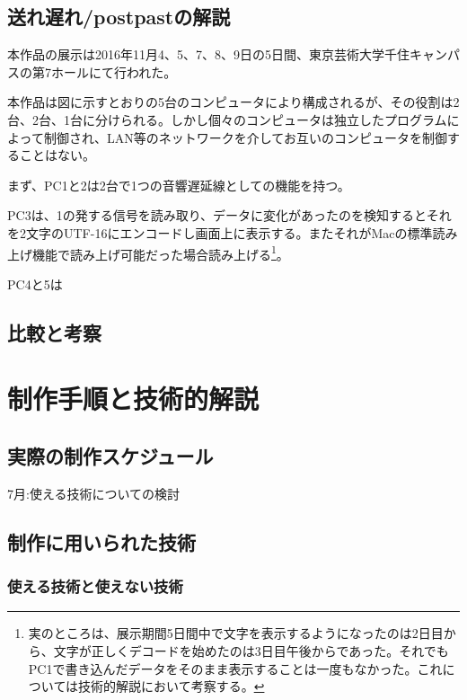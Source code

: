 \section{送れ\textbar{}遅れ/post\textbar{}pastの解説}\label{ux9001ux308cux9045ux308cpostpastux306eux89e3ux8aac}

本作品の展示は2016年11月4、5、7、8、9日の5日間、東京芸術大学千住キャンパスの第7ホールにて行われた。

本作品は図に示すとおりの5台のコンピュータにより構成されるが、その役割は2台、2台、1台に分けられる。しかし個々のコンピュータは独立したプログラムによって制御され、LAN等のネットワークを介してお互いのコンピュータを制御することはない。

まず、PC1と2は2台で1つの音響遅延線としての機能を持つ。

PC3は、1の発する信号を読み取り、データに変化があったのを検知するとそれを2文字のUTF-16にエンコードし画面上に表示する。またそれがMacの標準読み上げ機能で読み上げ可能だった場合読み上げる\footnote{実のところは、展示期間5日間中で文字を表示するようになったのは2日目から、文字が正しくデコードを始めたのは3日目午後からであった。それでもPC1で書き込んだデータをそのまま表示することは一度もなかった。これについては技術的解説において考察する。}。

PC4と5は

\section{比較と考察}\label{ux6bd4ux8f03ux3068ux8003ux5bdf}

\chapter{制作手順と技術的解説}\label{ux5236ux4f5cux624bux9806ux3068ux6280ux8853ux7684ux89e3ux8aac}

\section{実際の制作スケジュール}\label{ux5b9fux969bux306eux5236ux4f5cux30b9ux30b1ux30b8ux30e5ux30fcux30eb}

7月:使える技術についての検討

\section{制作に用いられた技術}\label{ux5236ux4f5cux306bux7528ux3044ux3089ux308cux305fux6280ux8853}

\subsection{使える技術と使えない技術}\label{ux4f7fux3048ux308bux6280ux8853ux3068ux4f7fux3048ux306aux3044ux6280ux8853}


